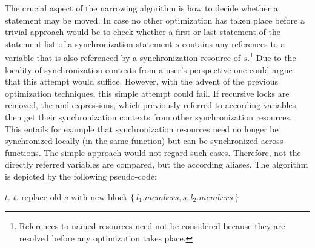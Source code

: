The crucial aspect of the narrowing algorithm is how to decide whether a statement may be moved. In case no other optimization has taken place before a trivial approach would be to check whether a first or last statement of the statement list of a synchronization statement $s$ contains any references to a variable that is also referenced by a synchronization resource of $s$.\footnote{References to named resources need not be considered because they are resolved before any optimization takes place.} Due to the locality of synchronization contexts from a user's perspective one could argue that this attempt would suffice. However, with the advent of the previous optimization techniques, this simple attempt could fail. If recursive locks are removed, the  and  expressions, which previously referred to according variables, then get their synchronization contexts from other synchronization resources. This entails for example that synchronization resources need no longer be synchronized locally (in the same function) but can be synchronized across functions. The simple approach would not regard such cases. Therefore, not the directly referred variables are compared, but the according aliases. The algorithm is depicted by the following pseudo-code:
\begin{algorithmic}
\State {}
    \State $t$. 
  \EndWhile
    \State $t$. 
  \EndWhile
    \State replace old $s$ with new block $\{\ l_1.\textit{members}, s, l_2.\textit{members}\ \}$
  \EndIf
\EndFor
\EndFunction
\end{algorithmic}
